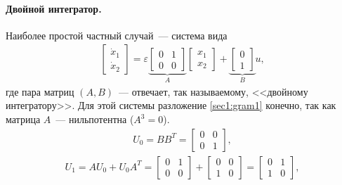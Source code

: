 \documentclass[../main.tex]{subfiles}
\begin{document}
\paragraph{Двойной интегратор.}
Наиболее простой частный случай~--- система вида 
\begin{gather*}
    \left[ {\begin{array}{*{20}{c}}
            {{{\dot x}_1}}\\
            {{{\dot x}_2}}
    \end{array}} \right] = \varepsilon \underbrace {\left[ {\begin{array}{*{20}{c}}
                 0&1\\
                 0&0
         \end{array}} \right]}_A\left[ {\begin{array}{*{20}{c}}
             {{x_1}}\\
             {{x_2}}
     \end{array}} \right] + \underbrace {\left[ {\begin{array}{*{20}{c}}
                 0\\
                 1
         \end{array}} \right]}_Bu,
\end{gather*}
где пара матриц $ (A,B) $~--- отвечает, так называемому, <<двойному интегратору>>.
Для этой системы разложение \eqref{sec1:gram1} конечно, так как матрица $ A $~--- нильпотентна ($ A^3 = 0$).
\begin{gather*}
    U_0 = B B^T =  \left[ {\begin{array}{*{20}{c}}
             0&0\\
             0&1
     \end{array}}\right],
\end{gather*}
\begin{gather*}
     U_1 = A U_0 + U_0 A^T = \left[ {\begin{array}{*{20}{c}}
             0&1\\
             0&0
     \end{array}}\right] + \left[ {\begin{array}{*{20}{c}}
             0&0\\
             1&0
     \end{array}}\right] = \left[ {\begin{array}{*{20}{c}}
             0&1\\
             1&0
     \end{array}}\right],
\end{gather*}
\end{document}
